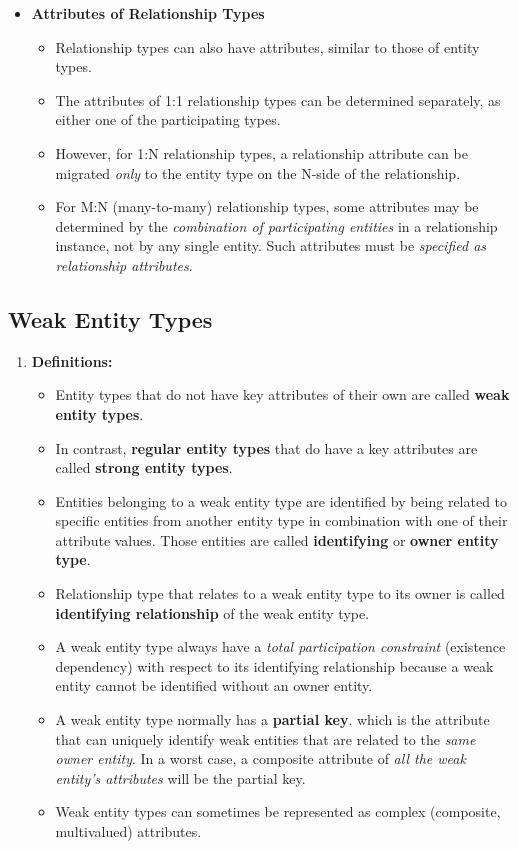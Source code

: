 \documentclass[10pt]{article}
\newcommand{\tf}{\textbf}
\newcommand{\ti}{\textit}
\begin{document}
\begin{enumerate}
\begin{itemize}
		\item \tf{Attributes of Relationship Types}
		\begin{itemize}
			\item Relationship types can also have attributes, similar to those of entity types.
			\item The attributes of 1:1 relationship types can be determined separately, as either one of the participating types.
			\item However, for 1:N relationship types, a relationship attribute can be migrated \ti{only} to the entity type on the N-side of the relationship.
			\item For M:N (many-to-many) relationship types, some attributes may be determined by the \ti{combination of participating entities} in a relationship instance, not by any single entity. Such attributes must be \ti{specified as relationship attributes}.
		\end{itemize}
	\end{itemize}
\end{enumerate}

\subsection{Weak Entity Types}
\begin{enumerate}
	\item \tf{Definitions: }
	\begin{itemize}
		\item Entity types that do not have key attributes of their own are called \tf{weak entity types}.
		\item In contrast, \tf{regular entity types} that do have a key attributes are called \tf{strong entity types}.
		\item Entities belonging to a weak entity type are identified by being related to specific entities from another entity type in combination with one of their attribute values. Those entities are called \tf{identifying} or \tf{owner entity type}.
		\item Relationship type that relates to a weak entity type to its owner is called \tf{identifying relationship} of the weak entity type.
		\item A weak entity type always have a \ti{total participation constraint} (existence dependency) with respect to its identifying relationship because a weak entity cannot be identified without an owner entity.
		\item A weak entity type normally has a \tf{partial key}. which is the attribute that can uniquely identify weak entities that are related to the \ti{same owner entity}. In a worst case, a composite attribute of \ti{all the weak entity's attributes} will be the partial key.
		\item Weak entity types can sometimes be represented as complex (composite, multivalued) attributes.
	\end{itemize}
\end{enumerate}
\end{document}
